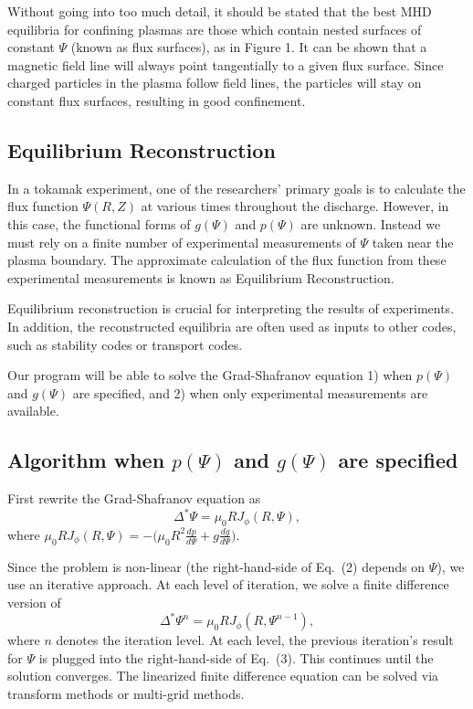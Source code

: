 \documentclass[paper=letter, fontsize=11pt]{scrartcl} %
\begin{document}
Without going into too much detail, it should be stated that the best MHD equilibria for confining plasmas are those which contain nested surfaces of constant $\Psi$ (known as flux surfaces), as in Figure 1.  It can be shown that a magnetic field line will always point tangentially to a given flux surface.  Since charged particles in the plasma follow field lines, the particles will stay on constant flux surfaces, resulting in good confinement.    



\subsection{Equilibrium Reconstruction}

In a tokamak experiment, one of the researchers' primary goals is to calculate the flux function $\Psi(R,Z)$ at various times throughout the discharge.  However, in this case, the functional forms of $g(\Psi)$ and $p(\Psi)$ are unknown.  Instead we must rely on a finite number of experimental measurements of $\Psi$ taken near the plasma boundary.  The approximate calculation of the flux function from these experimental measurements is known as Equilibrium Reconstruction.  

Equilibrium reconstruction is crucial for interpreting the results of experiments. In addition, the reconstructed equilibria are often used as inputs to other codes, such as stability codes or transport codes.  

Our program will be able to solve the Grad-Shafranov equation 1) when $p(\Psi)$ and $g(\Psi)$ are specified, and 2) when only experimental measurements are available.

\subsection{Algorithm when $p(\Psi)$ and $g(\Psi)$ are specified}



First rewrite the Grad-Shafranov equation as
\begin{equation}
\Delta^{*}\Psi = \mu_0 R J_{\phi} (R, \Psi),
\end{equation}
where $\mu_0 R J_{\phi} (R,\Psi) = - \big(\mu_0 R^2 \frac{d p}{d\Psi} + g \frac{d g}{d\Psi}\big)$.

Since the problem is non-linear (the right-hand-side of Eq.~(2) depends on $\Psi$), we use an iterative approach.  At each level of iteration, we solve a finite difference version of 
\begin{equation}
\Delta^{*}\Psi^{n} = \mu_0 R J_\phi (R, \Psi^{n-1}),
\end{equation}
where $n$ denotes the iteration level. At each level, the previous iteration's result for $\Psi$ is plugged into the right-hand-side of Eq.~(3).  This continues until the solution converges.  The linearized finite difference equation can be solved via transform methods or multi-grid methods.
\end{document}
